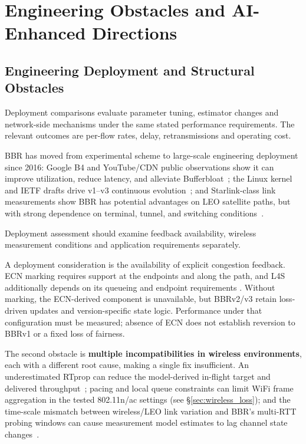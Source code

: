 \documentclass[a4paper,fleqn]{cas-sc}
\begin{document}
\section{Engineering Obstacles and AI-Enhanced Directions}
\label{sec:deployment}

\subsection{Engineering Deployment and Structural Obstacles}
\label{sec:engineering}

Deployment comparisons evaluate parameter tuning, estimator changes and
network-side mechanisms under the same stated performance requirements.
The relevant outcomes are per-flow rates, delay, retransmissions and
operating cost.

BBR has moved from experimental scheme to large-scale engineering deployment since
2016: Google B4 and YouTube/CDN public observations show it can improve
utilization, reduce latency, and alleviate
Bufferbloat~\citep{cardwell2017bbr}; the Linux kernel and IETF drafts drive v1--v3
continuous evolution~\citep{cardwell2017bbr,cardwell2019bbrv2,ietf_ccwg_bbr,abrol2026bbr};
and Starlink-class link measurements show BBR has potential advantages on LEO
satellite paths, but with strong dependence on terminal, tunnel, and switching
conditions~\citep{deutschmann2023starlink,kamel2024starquic}.

Deployment assessment should examine feedback availability, wireless
measurement conditions and application requirements separately.

A deployment consideration is the availability of explicit congestion
feedback. ECN marking requires support at the endpoints and along the path,
and L4S additionally depends on its queueing and endpoint requirements
\citep{rfc3168,rfc9330,rfc9331,rfc9332}. Without marking, the ECN-derived
component is unavailable, but BBRv2/v3 retain loss-driven updates and
version-specific state logic. Performance under that configuration must be
measured; absence of ECN does not establish reversion to BBRv1 or a fixed
loss of fairness.

The second obstacle is \textbf{multiple incompatibilities in wireless environments},
each with a different root cause, making a single fix insufficient. An underestimated RTprop
can reduce the model-derived in-flight target and delivered throughput~\citep{abrol2026bbr}; pacing and local queue constraints can limit WiFi frame
aggregation in the tested 802.11n/ac settings (see \S\ref{sec:wireless_loss}); and the time-scale mismatch between
wireless/LEO link variation and BBR's multi-RTT probing windows can cause
measurement model estimates to lag channel state changes~\citep{wang2024bbr_leo,kamel2024starquic,laniewski2024road}.
\end{document}
